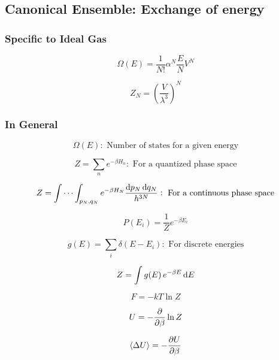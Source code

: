 \documentclass{article}
\begin{document}
\subsection{Canonical Ensemble: \normalfont Exchange of energy}
\subsubsection{Specific to Ideal Gas}
\begin{equation}
	\Omega(E)=\frac{1}{N!}\alpha^N \frac{E}{N}V^N
\end{equation}

\begin{equation}
	Z_N=\left(\frac{V}{\lambda^3}\right)^N
\end{equation}
\subsubsection{In General}
\begin{equation}
	\Omega(E): \text{   Number of states for a given energy}
\end{equation}

\begin{equation}
	Z=\sum_n e^{-\beta H_n}: \text{   For a quantized phase space}
\end{equation}

\begin{equation}
	Z=\idotsint_{p_N, q_N} e^{-\beta H_N} \frac{\dif p_N \dif q_N}{h^{3N}}: \text{   For a continuous phase space}
\end{equation}

\begin{equation}
	P(E_i)=\frac{1}{Z}e^{-\beta E_i}
\end{equation}

\begin{equation}
	g(E)=\sum_i \delta(E-E_i): \text{   For discrete energies}
\end{equation}

\begin{equation}
	Z=\int g(E) \, e^{-\beta E}\dif E
\end{equation}

\begin{equation}
	F=-kT\ln Z
\end{equation}

\begin{equation}
	U=-\pdv{\beta}\ln Z
\end{equation}

\begin{equation}
	\langle \Delta U \rangle=-\pdv{U}{\beta}
\end{equation}
\end{document}
